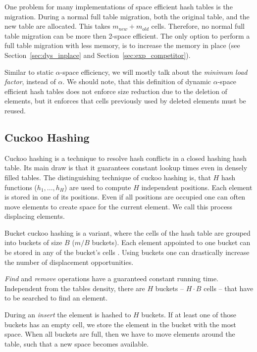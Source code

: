 \documentclass[a4paper,UKenglish]{lipics-v2016}
\begin{document}
One problem for many implementations of space efficient hash tables is
the migration.  During a normal full table migration, both the
original table, and the new table are allocated.  This takes
$\textit{m}_{\textit{new}} + \textit{m}_{\textit{old}}$
cells. Therefore, no normal full table migration can be more then
2-space efficient.  The only option to perform a full table migration
with less memory, is to increase the memory in place (see
Section~\ref{sec:dys_inplace} and
Section~\ref{sec:exp_competitor}).

Similar to static $\alpha$-space efficiency, we will mostly talk about
the \emph{minimum load factor}, instead of $\alpha$.  We should note,
that this definition of dynamic $\alpha$-space efficient hash tables
does not enforce size reduction due to the deletion of elements, but
it enforces that cells previously used by deleted elements must be reused.

\subsection{Cuckoo Hashing}
\label{sec:pre_cuckoo}
Cuckoo hashing is a technique to resolve hash conflicts in a closed
hashing hash table. Its main draw is that it guarantees constant
lookup times even in densely filled tables.  The distinguishing
technique of cuckoo hashing is, that $H$ hash functions ($h_1, ... ,
h_H$) are used to compute $H$ independent positions. Each element is
stored in one of its positions.  Even if all positions are occupied
one can often move elements to create space for the current
element. We call this process displacing elements.

Bucket cuckoo hashing is a variant, where the cells of the hash table
are grouped into buckets of size $B$ ($m/B$ buckets).  Each element
appointed to one bucket can be stored in any of the bucket's cells .
Using buckets one can drastically increase the number of displacement
opportunities.

\emph{Find} and \emph{remove} operations have a guaranteed constant
running time. Independent from the tables density, there are $H$
buckets -- $H\cdot B$ cells -- that have to be searched to find an
element.

During an \emph{insert} the element is hashed to $H$ buckets.  If at least
one of those buckets has an empty cell, we store the element in the
bucket with the most space.  When all buckets are full, then we
have to move elements around the table, such that a new space becomes
available.
\end{document}
